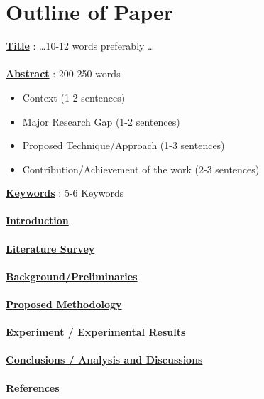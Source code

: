 \documentclass{article}
\author{Prof. Debasis Samanta}
\date{\vspace{-1ex}}
\begin{document}
\maketitle

\section{Outline of Paper}
\Large{\textbf{\underline{Title}}} :  \ldots 10-12 words preferably \ldots \\\\
\Large{\textbf{\underline{Abstract}}} : 200-250 words
\begin{itemize}
    \item Context (1-2 sentences)
    \item Major Research Gap (1-2 sentences)
    \item Proposed Technique/Approach (1-3 sentences)
    \item Contribution/Achievement of the work (2-3 sentences)
\end{itemize}
\Large{\textbf{\underline{Keywords}}} : 5-6 Keywords\\\\
\Large{\textbf{\underline{Introduction}}}\\\\
\Large{\textbf{\underline{Literature Survey}}}\\\\
\Large{\textbf{\underline{Background/Preliminaries}}}\\\\
\Large{\textbf{\underline{Proposed Methodology}}}\\\\
\Large{\textbf{\underline{Experiment / Experimental Results}}}\\\\
\Large{\textbf{\underline{Conclusions / Analysis and Discussions}}}\\\\
\Large{\textbf{\underline{References}}}\\\\
\newpage
\end{document}
